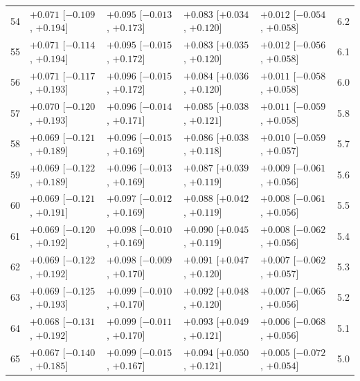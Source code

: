 \begin{longtable}{rllllr}
54 & $+0.071$ {\scriptsize [$-0.109$, $+0.194$]} & $+0.095$ {\scriptsize [$-0.013$, $+0.173$]} & $+0.083$ {\scriptsize [$+0.034$, $+0.120$]} & $+0.012$ {\scriptsize [$-0.054$, $+0.058$]} & 6.2 \\
55 & $+0.071$ {\scriptsize [$-0.114$, $+0.194$]} & $+0.095$ {\scriptsize [$-0.015$, $+0.172$]} & $+0.083$ {\scriptsize [$+0.035$, $+0.120$]} & $+0.012$ {\scriptsize [$-0.056$, $+0.058$]} & 6.1 \\
56 & $+0.071$ {\scriptsize [$-0.117$, $+0.193$]} & $+0.096$ {\scriptsize [$-0.015$, $+0.172$]} & $+0.084$ {\scriptsize [$+0.036$, $+0.120$]} & $+0.011$ {\scriptsize [$-0.058$, $+0.058$]} & 6.0 \\
57 & $+0.070$ {\scriptsize [$-0.120$, $+0.193$]} & $+0.096$ {\scriptsize [$-0.014$, $+0.171$]} & $+0.085$ {\scriptsize [$+0.038$, $+0.121$]} & $+0.011$ {\scriptsize [$-0.059$, $+0.058$]} & 5.8 \\
58 & $+0.069$ {\scriptsize [$-0.121$, $+0.189$]} & $+0.096$ {\scriptsize [$-0.015$, $+0.169$]} & $+0.086$ {\scriptsize [$+0.038$, $+0.118$]} & $+0.010$ {\scriptsize [$-0.059$, $+0.057$]} & 5.7 \\
59 & $+0.069$ {\scriptsize [$-0.122$, $+0.189$]} & $+0.096$ {\scriptsize [$-0.013$, $+0.169$]} & $+0.087$ {\scriptsize [$+0.039$, $+0.119$]} & $+0.009$ {\scriptsize [$-0.061$, $+0.056$]} & 5.6 \\
60 & $+0.069$ {\scriptsize [$-0.121$, $+0.191$]} & $+0.097$ {\scriptsize [$-0.012$, $+0.169$]} & $+0.088$ {\scriptsize [$+0.042$, $+0.119$]} & $+0.008$ {\scriptsize [$-0.061$, $+0.056$]} & 5.5 \\
61 & $+0.069$ {\scriptsize [$-0.120$, $+0.192$]} & $+0.098$ {\scriptsize [$-0.010$, $+0.169$]} & $+0.090$ {\scriptsize [$+0.045$, $+0.119$]} & $+0.008$ {\scriptsize [$-0.062$, $+0.056$]} & 5.4 \\
62 & $+0.069$ {\scriptsize [$-0.122$, $+0.192$]} & $+0.098$ {\scriptsize [$-0.009$, $+0.170$]} & $+0.091$ {\scriptsize [$+0.047$, $+0.120$]} & $+0.007$ {\scriptsize [$-0.062$, $+0.057$]} & 5.3 \\
63 & $+0.069$ {\scriptsize [$-0.125$, $+0.193$]} & $+0.099$ {\scriptsize [$-0.010$, $+0.170$]} & $+0.092$ {\scriptsize [$+0.048$, $+0.120$]} & $+0.007$ {\scriptsize [$-0.065$, $+0.056$]} & 5.2 \\
64 & $+0.068$ {\scriptsize [$-0.131$, $+0.192$]} & $+0.099$ {\scriptsize [$-0.011$, $+0.170$]} & $+0.093$ {\scriptsize [$+0.049$, $+0.121$]} & $+0.006$ {\scriptsize [$-0.068$, $+0.056$]} & 5.1 \\
65 & $+0.067$ {\scriptsize [$-0.140$, $+0.185$]} & $+0.099$ {\scriptsize [$-0.015$, $+0.167$]} & $+0.094$ {\scriptsize [$+0.050$, $+0.121$]} & $+0.005$ {\scriptsize [$-0.072$, $+0.054$]} & 5.0 \\

\end{longtable}
